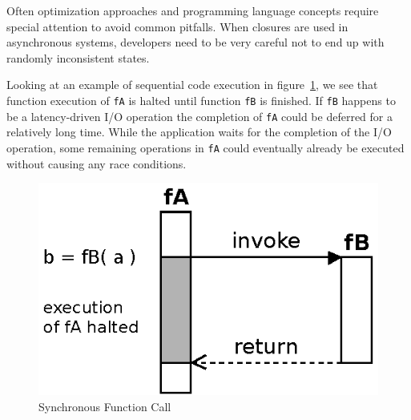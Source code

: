 
Often optimization approaches and programming language concepts require special attention to avoid common pitfalls.
When closures are used in asynchronous systems, developers need to be very careful not to end up with randomly inconsistent states.


Looking at an example of sequential code execution in figure~\ref{fig:Closures_Synchronous}, we see that function execution of \texttt{fA} is halted until function \texttt{fB} is finished.
If \texttt{fB} happens to be a latency-driven I/O operation the completion of \texttt{fA} could be deferred for a relatively long time.
While the application waits for the completion of the I/O operation, some remaining operations in \texttt{fA} could eventually already be executed without causing any race conditions.
\begin{figure}[h!]
\centering
  \includegraphics{figures/Closures_Synchronous}
\caption{Synchronous Function Call}
\label{fig:Closures_Synchronous}
\end{figure}


